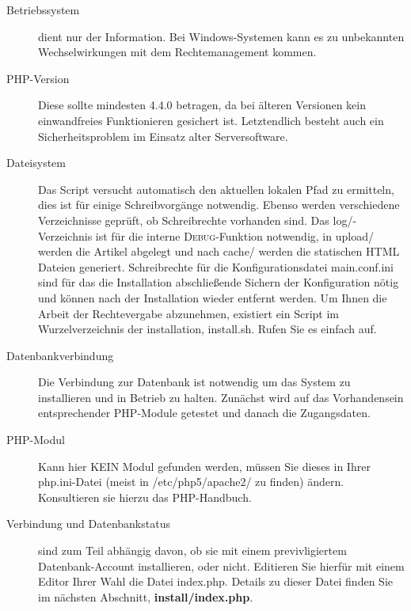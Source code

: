 \documentclass[a4paper,10pt,twoside]{article}
\begin{document}
 \begin{description}
	\item[Betriebssystem] dient nur der Information. Bei Windows-Systemen kann es
	zu unbekannten Wechselwirkungen mit dem Rechtemanagement kommen.
%
	\item[PHP-Version] Diese sollte mindesten 4.4.0 betragen, da bei älteren
	Versionen kein einwandfreies Funktionieren gesichert ist. Letztendlich besteht
	auch ein Sicherheitsproblem im Einsatz alter Serversoftware.
%
	\item[Dateisystem] Das Script versucht automatisch den aktuellen lokalen Pfad
	zu ermitteln, dies ist für einige Schreibvorgänge notwendig. Ebenso werden
	verschiedene Verzeichnisse geprüft, ob Schreibrechte vorhanden sind. Das
	\textsf{log/}-Verzeichnis ist für die interne \textsc{Debug}-Funktion notwendig,
	in \textsf{upload/} werden die Artikel abgelegt und nach \textsf{cache/} werden die
	statischen HTML Dateien generiert. Schreibrechte für die Konfigurationsdatei
	\textsf{main.conf.ini} sind für das die Installation abschließende Sichern der
	Konfiguration nötig und können nach der Installation wieder entfernt werden.
    Um Ihnen die Arbeit der Rechtevergabe abzunehmen, existiert ein Script im
    Wurzel\-ver\-zeichnis der installation, \textsf{install.sh}. Rufen Sie es
    einfach auf. 
	\item[Datenbankverbindung] Die Verbindung zur Datenbank ist notwendig um das
	System zu installieren und in Betrieb zu halten. Zunächst wird auf das
	Vorhandensein entsprechender PHP-Module getestet und danach die Zu\-gangs\-da\-ten.
%
	\item[PHP-Modul] Kann hier KEIN Modul gefunden werden, müssen Sie dieses in
	Ihrer \textsf{php.ini}-Datei (meist in \textsf{/etc/php5/apache2/} zu finden)
	ändern. Konsultieren sie hierzu das PHP-Handbuch.
	\item[Verbindung und Datenbankstatus] sind zum Teil abhängig davon, ob sie mit
	einem previvligiertem Datenbank-Account installieren, oder nicht. Editieren Sie
	hierfür mit einem Editor Ihrer Wahl die Datei \textsf{index.php}.
	Details zu dieser Datei finden Sie im nächsten Abschnitt, \textbf{install/index.php}.
 \end{description}
%
%
%
\end{document}
